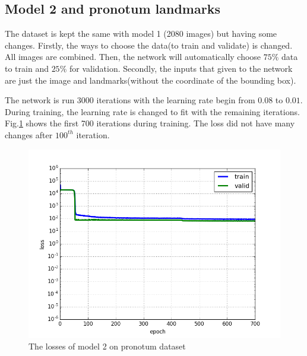\documentclass[12pt,a4paper]{article}
\begin{document}
\subsection{Model 2 and pronotum landmarks}
The dataset is kept the same with model 1 (2080 images) but having some changes. Firstly, the ways to choose the data(to train and validate) is changed. All images are combined. Then, the network will automatically choose $75 \%$ data to train and $25 \%$ for validation. Secondly, the inputs that given to the network are just the image and landmarks(without the coordinate of the bounding box).

The network is run 3000 iterations with the learning rate begin from $0.08$ to $0.01$. During training, the learning rate is changed to fit with the remaining iterations\cite{lecun2012efficient}. Fig.\ref{model2pl} shows the first 700 iterations during training. The loss did not have many changes after $100^{th}$ iteration.

\begin{figure}[h!]
	\centering
	\includegraphics[scale=0.4]{images/figure_1_loss_celia}
	\caption{The losses of model 2 on pronotum dataset}
	\label{model2pl}
\end{figure}
\end{document}

